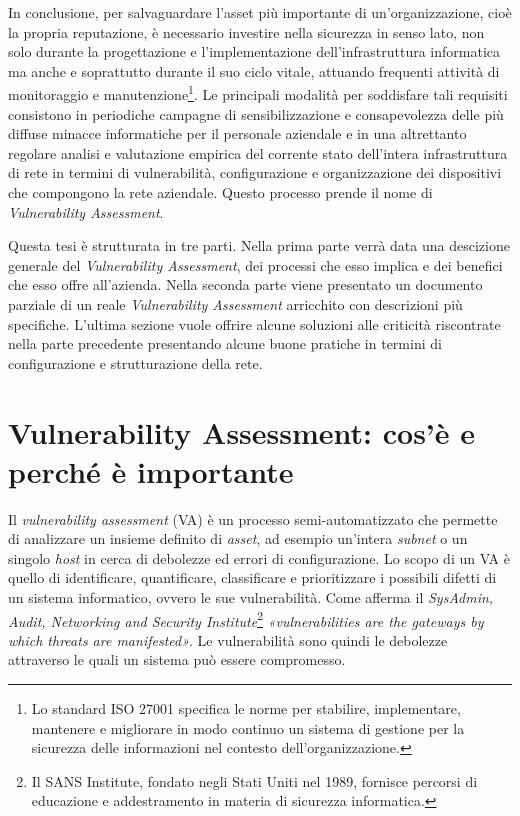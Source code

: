 \documentclass[target=bach,aauheader=]{thud}
\begin{document}
In conclusione, per salvaguardare l’asset più importante di un’organizzazione, cioè la propria reputazione, è necessario investire nella sicurezza in senso lato, non solo durante la progettazione e l’implementazione dell’infrastruttura informatica ma anche e soprattutto durante il suo ciclo vitale, attuando frequenti attività di monitoraggio e manutenzione\footnote{Lo standard ISO 27001 specifica le norme per stabilire, implementare, mantenere e migliorare in modo continuo un sistema di gestione per la sicurezza delle informazioni nel contesto dell’organizzazione.}. Le principali modalità per soddisfare tali requisiti consistono in periodiche campagne di sensibilizzazione e consapevolezza delle più diffuse minacce informatiche per il personale aziendale e in una altrettanto regolare analisi e valutazione empirica del corrente stato dell’intera infrastruttura di rete in termini di vulnerabilità, configurazione e organizzazione dei dispositivi che compongono la rete aziendale.
Questo processo prende il nome di \textit{Vulnerability Assessment}.

Questa tesi è strutturata in tre parti. Nella prima parte verrà data una descizione generale del \textit{Vulnerability Assessment}, dei processi che esso implica e dei benefici che esso offre all'azienda. Nella seconda parte viene presentato un documento parziale di un reale \textit{Vulnerability Assessment} arricchito con descrizioni più specifiche. L'ultima sezione vuole offrire alcune soluzioni alle criticità riscontrate nella parte precedente presentando alcune buone pratiche in termini di configurazione e strutturazione della rete.


\chapter{Vulnerability Assessment: cos’è e perché è importante}

Il \textit{vulnerability assessment} (VA) è un processo semi-automatizzato che permette di analizzare un insieme definito di \textit{asset}, ad esempio un’intera \textit{subnet} o un singolo \textit{host} in cerca di debolezze ed errori di configurazione. Lo scopo di un VA è quello di identificare, quantificare, classificare e prioritizzare i possibili difetti di un sistema informatico, ovvero le sue vulnerabilità. Come afferma il \textit{SysAdmin, Audit, Networking and Security Institute}\footnote{Il SANS Institute, fondato negli Stati Uniti nel 1989, fornisce percorsi di educazione e addestramento in materia di sicurezza informatica.} \textit{«vulnerabilities are the gateways by which threats are manifested»}. Le vulnerabilità sono quindi le debolezze attraverso le quali un sistema può essere compromesso.
\end{document}

